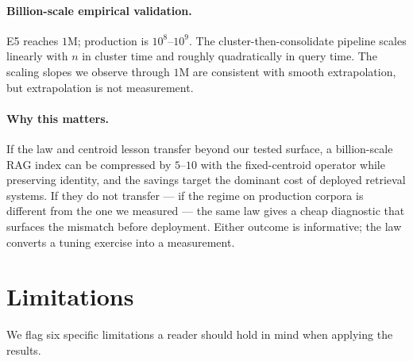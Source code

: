 \paragraph{Billion-scale empirical validation.} E5 reaches $1$M;
production is $10^8$--$10^9$. The cluster-then-consolidate pipeline
scales linearly with $n$ in cluster time and roughly quadratically
in query time. The scaling slopes we observe through $1$M are
consistent with smooth extrapolation, but extrapolation is not
measurement.

\paragraph{Why this matters.} If the law and centroid lesson
transfer beyond our tested surface, a billion-scale RAG index can be
compressed by $5$--$10$\texttimes{} with the fixed-centroid
operator while preserving identity, and the savings target the
dominant cost of deployed retrieval systems. If they do not
transfer --- if the regime on production corpora is different from
the one we measured --- the same law gives a cheap diagnostic that
surfaces the mismatch before deployment. Either outcome is
informative; the law converts a tuning exercise into a
measurement.

\section{Limitations}
\label{sec:limits}

We flag six specific limitations a reader should hold in mind when
applying the results.

